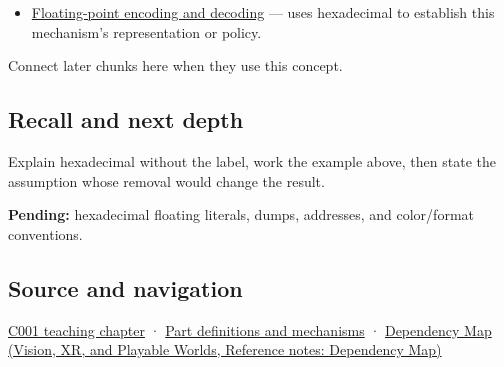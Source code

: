 \hypertarget{appendix-6b8075763724-used-by}{}

\begin{itemize}
\tightlist
\item
  \hyperref[appendix-6854d0e2218e]{Floating-point encoding and decoding} --- uses hexadecimal to establish this mechanism's representation or policy.
\end{itemize}

Connect later chunks here when they use this concept.

\subsection{Recall and next depth}\label{appendix-6b8075763724-recall-and-next-depth}

\hypertarget{appendix-6b8075763724-recall-and-next-depth}{}

Explain hexadecimal without the label, work the example above, then state the assumption whose removal would change the result.

\textbf{Pending:} hexadecimal floating literals, dumps, addresses, and color/format conventions.

\subsection{Source and navigation}\label{appendix-6b8075763724-source-and-navigation}

\hypertarget{appendix-6b8075763724-source-and-navigation}{}

\hyperref[01-foundations-i-ch001-from-a-signal-to-an-interpretation]{C001 teaching chapter} · \hyperref[appendix-fd090d982a15]{Part definitions and mechanisms} · \href{../07-Vision-XR-and-Playable-Worlds/main.pdf\#nameddest=appendix-4ad47bdd269a}{Dependency Map (Vision, XR, and Playable Worlds, Reference notes: Dependency Map)}
